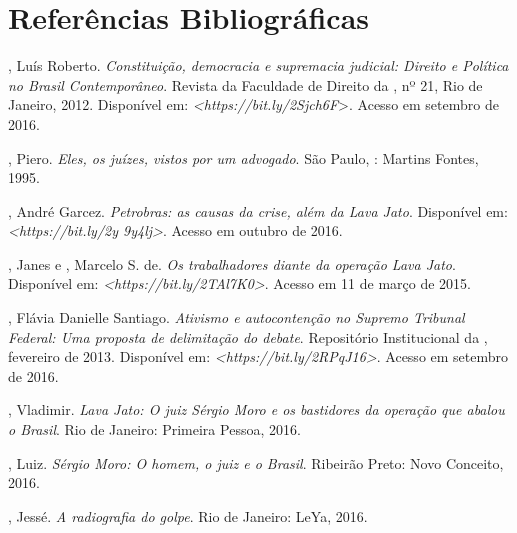 \section{Referências Bibliográficas}

\begin{Parskip}
, Luís Roberto. \emph{Constituição, democracia e
supremacia judicial: Direito e Política no Brasil Contemporâneo}.
Revista da Faculdade de Direito da , nº 21, Rio de Janeiro, 2012.
Disponível em:
\emph{\textless{}https://bit.ly/2Sjch6F}\textgreater{}.
Acesso em setembro de 2016.

, Piero. \emph{Eles, os juízes, vistos por um advogado}.
São Paulo, : Martins Fontes, 1995.

, André Garcez. \emph{Petrobras: as causas da crise, além da
Lava Jato}. Disponível em:
\emph{\textless{}https://bit.ly/2y 9y4lj\textgreater{}}.
Acesso em outubro de 2016.

, Janes e , Marcelo S. de. \emph{Os trabalhadores diante da
operação Lava Jato}. Disponível em:
\emph{\textless{}https://bit.ly/2TAl7K0\textgreater{}}.
Acesso em 11 de março de 2015.

, Flávia Danielle Santiago. \emph{Ativismo e autocontenção no
Supremo Tribunal Federal: Uma proposta de delimitação do debate}.
Repositório Institucional da , fevereiro de 2013. Disponível em:
\emph{\textless{}https://bit.ly/2RPqJ16\textgreater{}}.
Acesso em setembro de 2016.

, Vladimir. \emph{Lava Jato: O juiz Sérgio Moro e os
bastidores da operação que abalou o Brasil}. Rio de Janeiro:
Primeira Pessoa, 2016.

, Luiz. \emph{Sérgio Moro: O homem, o juiz e o
Brasil}. Ribeirão Preto: Novo Conceito, 2016.

, Jessé. \emph{A radiografia do golpe}. Rio de Janeiro: LeYa, 2016.
\end{Parskip}